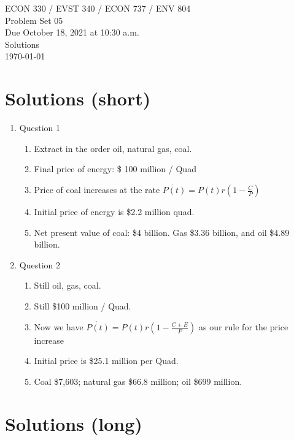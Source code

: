 \noindent
\Large ECON 330 / EVST 340 / ECON 737 / ENV 804 \\
 	\large Problem Set 05 \\
 	\large Due October 18, 2021 at 10:30 a.m.\\
 	\large Solutions \\
 	\today \\[1.5em] %

\section*{Solutions (short)}
    \begin{enumerate}
        \item Question 1
        \begin{enumerate}
            
        \item Extract in the order oil, natural gas, coal.
        \item Final price of energy: \$ 100 million / Quad
        \item Price of coal increases at the rate $\dot{P(t)} = P(t)r\left(1-\frac{C}{P}\right)$
        \item Initial price of energy is \$2.2 million quad.
        \item Net present value of coal: \$4 billion. Gas \$3.36 billion, and oil \$4.89 billion.
        \end{enumerate}
        
        \item Question 2
        \begin{enumerate}
            \item Still oil, gas, coal.
            \item Still \$100 million / Quad.
            \item Now we have $\dot{P(t)} = P(t)r\left(1-\frac{C+E}{P}\right)$ as our rule for the price increase
            \item Initial price is \$25.1 million per Quad.
            \item  Coal \$7,603; natural gas \$66.8 million; oil \$699 million.
        \end{enumerate}
    \end{enumerate}

\section*{Solutions (long)}

